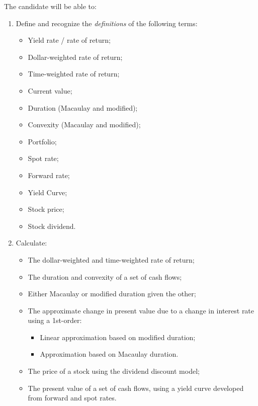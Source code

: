 \begin{outcomes}
The candidate will be able to:
\begin{enumerate}[label = \alph*), leftmargin = *]
	\item	Define and recognize the \textit{definitions} of the following terms:
		\begin{itemize}[leftmargin = *]
		\item	Yield rate / rate of return;
		\item	Dollar-weighted rate of return;
		\item	Time-weighted rate of return;
		\item	Current value;
		\item	Duration	 (Macaulay and modified);
		\item	Convexity (Macaulay and modified);
		\item	Portfolio;
		\item	Spot rate;
		\item	Forward rate;
		\item	Yield Curve;
		\item	Stock price;
		\item	Stock dividend.
		\end{itemize}
	\item	Calculate:
		\begin{itemize}[leftmargin = *]
		\item	The dollar-weighted and time-weighted rate of return;
		\item 	The duration and convexity of a set of cash flows;
		\item	Either Macaulay or modified duration given the other;
		\item	The approximate change in present value due to a change in interest rate using a 1st-order:
			\begin{itemize}[leftmargin = *]
			\item	Linear approximation based on modified duration;
			\item	Approximation based on Macaulay duration.
			\end{itemize}
		\item	The price of a stock using the dividend discount model;
		\item	The present value of a set of cash flows, using a yield curve developed from forward and spot rates.
		\end{itemize}
\end{enumerate}
\end{outcomes}

